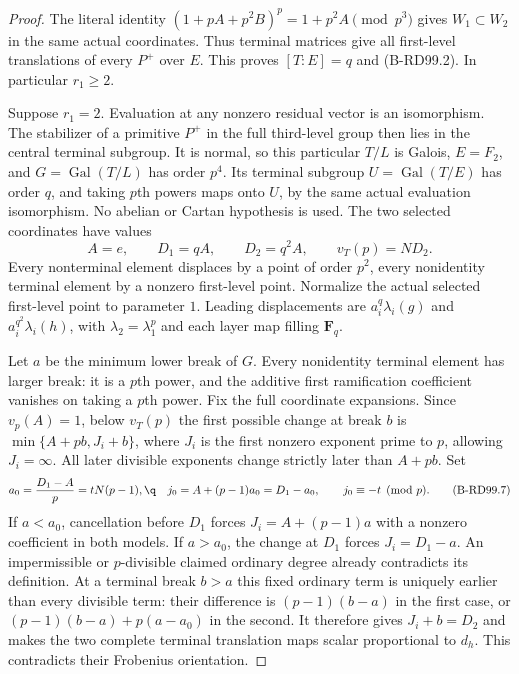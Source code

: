 \begin{proof}
The literal identity $(1+pA+p^2B)^p=1+p^2A\pmod{p^3}$
gives $W_1\subset W_2$ in the same actual coordinates.
Thus terminal matrices give all first-level translations of
every $P^+$ over $E$. This proves $[T:E]=q$ and (B-RD99.2).
In particular $r_1\ge2$.

Suppose $r_1=2$. Evaluation at any nonzero residual vector
is an isomorphism. The stabilizer of a primitive $P^+$ in
the full third-level group then lies in the central terminal
subgroup. It is normal, so this particular $T/L$ is Galois,
$E=F_2$, and $G=\operatorname{Gal}(T/L)$ has order $p^4$.
Its terminal subgroup $U=\operatorname{Gal}(T/E)$ has order
$q$, and taking $p$th powers maps onto $U$, by the same actual
evaluation isomorphism. No abelian or Cartan hypothesis is used.
The two selected coordinates have values
\[
 A=e,\qquad D_1=qA,\qquad D_2=q^2A,\qquad v_T(p)=ND_2.
                                                        \tag{B-RD99.6}
\]
Every nonterminal element displaces by a point of order $p^2$,
every nonidentity terminal element by a nonzero first-level
point. Normalize the actual selected first-level point to
parameter $1$. Leading displacements are
$a_i^q\lambda_i(g)$ and $a_i^{q^2}\lambda_i(h)$, with
$\lambda_2=\lambda_1^p$ and each layer map filling $\mathbf F_q$.

Let $a$ be the minimum lower break of $G$. Every nonidentity
terminal element has larger break: it is a $p$th power, and
the additive first ramification coefficient vanishes on taking
a $p$th power. Fix the full coordinate expansions. Since
$v_p(A)=1$, below $v_T(p)$ the first possible change at break
$b$ is $\min\{A+pb,J_i+b\}$, where $J_i$ is the first
nonzero exponent prime to $p$, allowing $J_i=\infty$.
All later divisible exponents change strictly later than
$A+pb$. Set
\[
 a_0=\frac{D_1-A}{p}=tN(p-1),\q\quad
 j_0=A+(p-1)a_0=D_1-a_0,\qquad j_0\equiv-t\pmod p.
                                                        \tag{B-RD99.7}
\]
If $a<a_0$, cancellation before $D_1$ forces
$J_i=A+(p-1)a$ with a nonzero coefficient in both models.
If $a>a_0$, the change at $D_1$ forces $J_i=D_1-a$.
An impermissible or $p$-divisible claimed ordinary degree
already contradicts its definition. At a terminal break $b>a$
this fixed ordinary term is uniquely earlier than every
divisible term: their difference is $(p-1)(b-a)$ in the
first case, or $(p-1)(b-a)+p(a-a_0)$ in the second.
It therefore gives $J_i+b=D_2$ and makes the two complete
terminal translation maps scalar proportional to $d_h$.
This contradicts their Frobenius orientation.


\end{proof}
